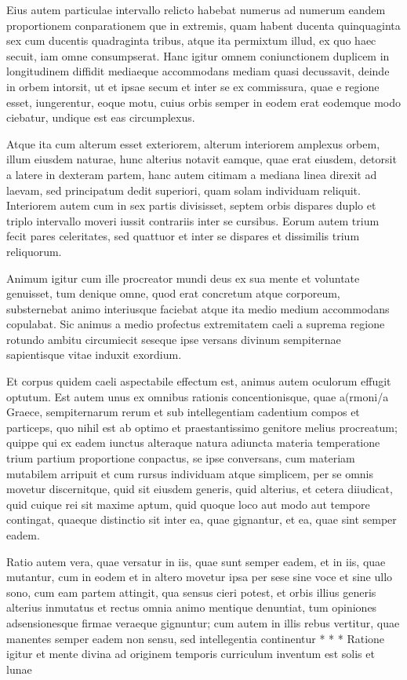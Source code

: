  Eius autem particulae intervallo relicto habebat numerus ad numerum eandem proportionem conparationem que in extremis, quam habent ducenta quinquaginta sex cum ducentis quadraginta tribus, atque ita permixtum illud, ex quo haec secuit, iam omne consumpserat. Hanc igitur omnem coniunctionem duplicem in longitudinem diffidit mediaeque accommodans mediam quasi decussavit, deinde in orbem intorsit, ut et ipsae secum et inter se ex commissura, quae e regione esset, iungerentur, eoque motu, cuius orbis semper in eodem erat eodemque modo ciebatur, undique est eas circumplexus.

 Atque ita cum alterum esset exteriorem, alterum interiorem amplexus orbem, illum eiusdem naturae, hunc alterius notavit eamque, quae erat eiusdem, detorsit a latere in dexteram partem, hanc autem citimam a mediana linea direxit ad laevam, sed principatum dedit superiori, quam solam individuam reliquit. Interiorem autem cum in sex partis divisisset, septem orbis dispares duplo et triplo intervallo moveri iussit contrariis inter se cursibus. Eorum autem trium fecit pares celeritates, sed quattuor et inter se dispares et dissimilis trium reliquorum.

 Animum igitur cum ille procreator mundi deus ex sua mente et voluntate genuisset, tum denique omne, quod erat concretum atque corporeum, substernebat animo interiusque faciebat atque ita medio medium accommodans copulabat. Sic animus a medio profectus extremitatem caeli a suprema regione rotundo ambitu circumiecit seseque ipse versans divinum sempiternae sapientisque vitae induxit exordium.

 Et corpus quidem caeli aspectabile effectum est, animus autem oculorum effugit optutum. Est autem unus ex omnibus rationis concentionisque, quae a(rmoni/a Graece, sempiternarum rerum et sub intellegentiam cadentium compos et particeps, quo nihil est ab optimo et praestantissimo genitore melius procreatum; quippe qui ex eadem iunctus alteraque natura adiuncta materia temperatione trium partium proportione conpactus, se ipse conversans, cum materiam mutabilem arripuit et cum rursus individuam atque simplicem, per se omnis movetur discernitque, quid sit eiusdem generis, quid alterius, et cetera diiudicat, quid cuique rei sit maxime aptum, quid quoque loco aut modo aut tempore contingat, quaeque distinctio sit inter ea, quae gignantur, et ea, quae sint semper eadem.

 Ratio autem vera, quae versatur in iis, quae sunt semper eadem, et in iis, quae mutantur, cum in eodem et in altero movetur ipsa per sese sine voce et sine ullo sono, cum eam partem attingit, qua sensus cieri potest, et orbis illius generis alterius inmutatus et rectus omnia animo mentique denuntiat, tum opiniones adsensionesque firmae veraeque gignuntur; cum autem in illis rebus vertitur, quae manentes semper eadem non sensu, sed intellegentia continentur * * * Ratione igitur et mente divina ad originem temporis curriculum inventum est solis et lunae

